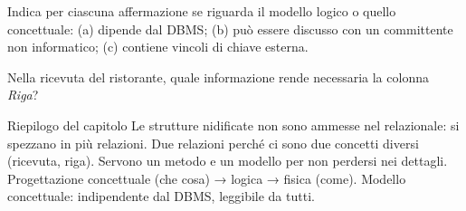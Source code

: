 \begin{esercizi}
\begin{passi}
  \item Indica per ciascuna affermazione se riguarda il modello logico o quello concettuale: (a) dipende dal DBMS; (b) può essere discusso con un committente non informatico; (c) contiene vincoli di chiave esterna.
  \item Nella ricevuta del ristorante, quale informazione rende necessaria la colonna \emph{Riga}?
\end{passi}
\end{esercizi}

\begin{appunti}{Riepilogo del capitolo}
 Le strutture nidificate non sono ammesse nel relazionale: si spezzano in più relazioni.
 Due relazioni perché ci sono due concetti diversi (ricevuta, riga).
 Servono un metodo e un modello per non perdersi nei dettagli.
 Progettazione concettuale (che cosa) → logica → fisica (come).
 Modello concettuale: indipendente dal DBMS, leggibile da tutti.
\end{appunti}
